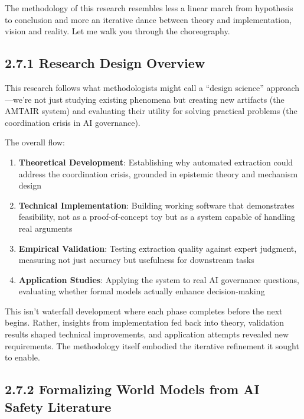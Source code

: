 \documentclass[
  11pt,
  letterpaper,
  openany]{book}
\providecommand{\tightlist}{%
  \setlength{\itemsep}{0pt}\setlength{\parskip}{0pt}}
\begin{document}
The methodology of this research resembles less a linear march from
hypothesis to conclusion and more an iterative dance between theory and
implementation, vision and reality. Let me walk you through the
choreography.

\subsection{2.7.1 Research Design Overview}\label{sec-research-design}

This research follows what methodologists might call a ``design
science'' approach---we're not just studying existing phenomena but
creating new artifacts (the AMTAIR system) and evaluating their utility
for solving practical problems (the coordination crisis in AI
governance).

The overall flow:

\begin{enumerate}
\def\labelenumi{\arabic{enumi}.}
\tightlist
\item
  \textbf{Theoretical Development}: Establishing why automated
  extraction could address the coordination crisis, grounded in
  epistemic theory and mechanism design
\item
  \textbf{Technical Implementation}: Building working software that
  demonstrates feasibility, not as a proof-of-concept toy but as a
  system capable of handling real arguments
\item
  \textbf{Empirical Validation}: Testing extraction quality against
  expert judgment, measuring not just accuracy but usefulness for
  downstream tasks
\item
  \textbf{Application Studies}: Applying the system to real AI
  governance questions, evaluating whether formal models actually
  enhance decision-making
\end{enumerate}

This isn't waterfall development where each phase completes before the
next begins. Rather, insights from implementation fed back into theory,
validation results shaped technical improvements, and application
attempts revealed new requirements. The methodology itself embodied the
iterative refinement it sought to enable.

\subsection{2.7.2 Formalizing World Models from AI Safety
Literature}\label{sec-formalizing-world-models}
\end{document}
